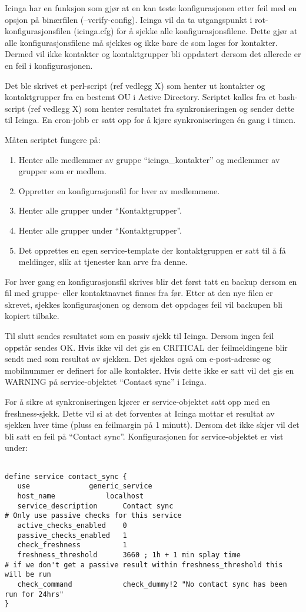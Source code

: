 Icinga har en funksjon som gjør at en kan teste konfigurasjonen etter feil med en opsjon på binærfilen (--verify-config). Icinga vil da ta utgangspunkt i rot-konfigurasjonsfilen (icinga.cfg) for å sjekke alle konfigurasjonsfilene. Dette gjør at alle konfigurasjonsfilene må sjekkes og ikke bare de som lages for kontakter. Dermed vil ikke kontakter og kontaktgrupper bli oppdatert dersom det allerede er en feil i konfigurasjonen. 

Det ble skrivet et perl-script (ref vedlegg X) som henter ut kontakter og kontaktgrupper fra en bestemt OU i Active Directory. Scriptet kalles fra et bash-script (ref vedlegg X) som henter resultatet fra synkroniseringen og sender dette til Icinga. En cron-jobb er satt opp for å kjøre synkroniseringen én gang i timen.

Måten scriptet fungere på:
\begin{enumerate}
	\item Henter alle medlemmer av gruppe “icinga\_kontakter” og medlemmer av grupper som er medlem.
	\item Oppretter en konfigurasjonsfil for hver av medlemmene.
	\item Henter alle grupper under “Kontaktgrupper”.
	\item Henter alle grupper under “Kontaktgrupper”.
	\item Det opprettes en egen service-template der kontaktgruppen er satt til å få meldinger, slik at tjenester kan arve fra denne.
\end{enumerate}



For hver gang en konfigurasjonsfil skrives blir det først tatt en backup dersom en fil med gruppe- eller kontaktnavnet finnes fra før. Etter at den nye filen er skrevet, sjekkes konfigurasjonen og dersom det oppdages feil vil backupen bli kopiert tilbake. 

Til slutt sendes resultatet som en passiv sjekk til Icinga. Dersom ingen feil oppstår sendes OK. Hvis ikke vil det gis en CRITICAL der feilmeldingene blir sendt med som resultat av sjekken. Det sjekkes også om e-post-adresse og mobilnummer er definert for alle kontakter. Hvis dette ikke  er satt vil det gis en WARNING på service-objektet “Contact sync” i Icinga.

For å sikre at synkroniseringen kjører er service-objektet satt opp med en freshness-sjekk. Dette vil si at det forventes at Icinga mottar et resultat av sjekken hver time (pluss en feilmargin på 1 minutt). Dersom det ikke skjer vil det bli satt en feil på “Contact sync”. Konfigurasjonen for service-objektet er vist under:
\begin{lstlisting}

define service contact_sync {
   use 				generic_service
   host_name      		localhost
   service_description  	Contact sync
# Only use passive checks for this service
   active_checks_enabled   	0
   passive_checks_enabled  	1
   check_freshness      	1
   freshness_threshold     	3660 ; 1h + 1 min splay time
# if we don't get a passive result within freshness_threshold this will be run
   check_command     		check_dummy!2 "No contact sync has been run for 24hrs" 
}
\end{lstlisting}

